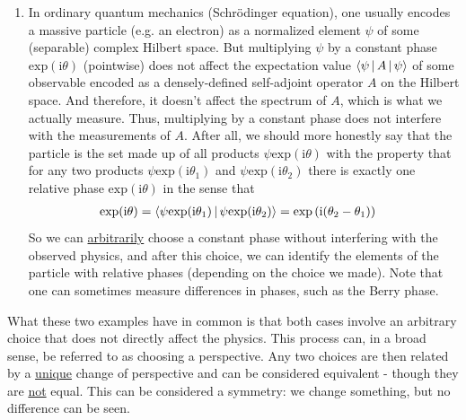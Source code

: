 \begin{enumerate}
\begin{enumerate}
\begin{align*}
    \ldots,
    \partial_{q_{\varphi^{\backprime}}^{n}(x)}
  \right)
  &=
  \left(
    \partial_{q_{\varphi}^{0}(x)},
    \ldots,
    \partial_{q_{\varphi}^{n}(x)}
  \right)
  \cdot
  G
\end{align*}
interpreted as matrix multiplication.
So we can \underline{arbitrarily} choose coordinates without interfering with the observed physics, and after this choice, we can identify the coordinates with invertible matrices (depending on the choice we made).
\item[$\bullet$]
In ordinary quantum mechanics (Schr\"{o}dinger equation), one usually encodes a massive particle (e.g. an electron) as a normalized element $\psi$ of some (separable) complex Hilbert space.
But multiplying $\psi$ by a constant phase $\mathrm{exp}(\mathrm{i}\theta)$ (pointwise) does not affect the expectation value $\Braket{\psi|A|\psi}$ of some observable encoded as a densely-defined self-adjoint operator $A$ on the Hilbert space.
And therefore, it doesn't affect the spectrum of $A$, which is what we actually measure.
Thus, multiplying by a constant phase does not interfere with the measurements of $A$.
After all, we should more honestly say that the particle is the set made up of all products $\psi\mathrm{exp}(\mathrm{i}\theta)$ with the property that for any two products $\psi\mathrm{exp}(\mathrm{i}\theta_{1})$ and $\psi\mathrm{exp}(\mathrm{i}\theta_{2})$ there is exactly one relative phase $\mathrm{exp}(\mathrm{i}\theta)$ in the sense that
\begin{align*}
  \mathrm{exp}(\mathrm{i}\theta)
  &=
  \Braket{\psi\mathrm{exp}(\mathrm{i}\theta_{1})|\psi\mathrm{exp}(\mathrm{i}\theta_{2})}
  =
  \mathrm{exp}
  \left(
    \mathrm{i}(\theta_{2} - \theta_{1})
  \right)
\end{align*}
So we can \underline{arbitrarily} choose a constant phase without interfering with the observed physics, and after this choice, we can identify the elements of the particle with relative phases (depending on the choice we made).
Note that one can sometimes measure differences in phases, such as the Berry phase.
\end{enumerate}
What these two examples have in common is that both cases involve an arbitrary choice that does not directly affect the physics.
This process can, in a broad sense, be referred to as {\glqq}choosing a perspective{\grqq}.
Any two choices are then related by a \underline{unique} {\glqq}change of perspective{\grqq} and can be considered {\glqq}equivalent{\grqq} - though they are \underline{not} equal.
This can be considered a symmetry: we change something, but no difference can be seen.

\end{enumerate}
